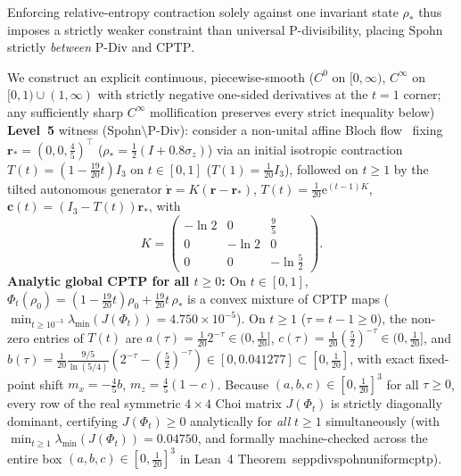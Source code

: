 \documentclass[twocolumn,10pt,amsmath,amssymb,floatfix]{revtex4-2}
\theoremstyle{plain}
\theoremstyle{definition}
\newcommand{\ee}{\mathrm{e}}
\newcommand{\leanid}[1]{{\footnotesize\ttfamily\def\_{\textunderscore\penalty0\hspace{0pt}}#1}}
\begin{document}
Enforcing relative-entropy contraction solely against one invariant state $\rho_*$ thus imposes a strictly weaker constraint than universal P-divisibility, placing $\mathrm{Spohn}$ strictly \emph{between} $\mathrm{P\text{-}Div}$ and $\mathrm{CPTP}$.

We construct an explicit continuous, piecewise-smooth ($C^0$ on $[0,\infty)$, $C^\infty$ on $[0,1)\cup(1,\infty)$ with strictly negative one-sided derivatives at the $t=1$ corner; any sufficiently sharp $C^\infty$ mollification preserves every strict inequality below) \textbf{Level~5} witness ($\mathrm{Spohn} \setminus \mathrm{P\text{-}Div}$): consider a non-unital affine Bloch flow~\cite{Ruskai2002LAA} fixing $\mathbf{r}_* = (0, 0, \frac{4}{5})^\top$ ($\rho_* = \frac{1}{2}(I + 0.8\sigma_z)$) via an initial isotropic contraction $T(t) = (1 - \frac{19}{20}t)I_3$ on $t \in [0,1]$ ($T(1) = \frac{1}{20}I_3$), followed on $t \ge 1$ by the tilted autonomous generator $\dot{\mathbf{r}} = K(\mathbf{r} - \mathbf{r}_*)$, $T(t) = \frac{1}{20}\ee^{(t-1)K}$, $\mathbf{c}(t) = (I_3 - T(t))\mathbf{r}_*$, with
\begin{equation}
\label{eq:level5_K}
K = \begin{pmatrix} -\ln 2 & 0 & \tfrac{9}{5} \\ 0 & -\ln 2 & 0 \\ 0 & 0 & -\ln\tfrac{5}{2} \end{pmatrix}.
\end{equation}
\textbf{Analytic global CPTP for all $t \ge 0$:} On $t \in [0,1]$, $\Phi_t(\rho_0) = (1-\frac{19}{20}t)\rho_0 + \frac{19}{20}t\,\rho_*$ is a convex mixture of CPTP maps ($\min_{t \ge 10^{-3}} \lambda_{\min}(J(\Phi_t)) = 4.750\times 10^{-5}$). On $t \ge 1$ ($\tau = t - 1 \ge 0$), the non-zero entries of $T(t)$ are $a(\tau) = \frac{1}{20}2^{-\tau} \in (0, \frac{1}{20}]$, $c(\tau) = \frac{1}{20}(\frac{5}{2})^{-\tau} \in (0, \frac{1}{20}]$, and $b(\tau) = \frac{1}{20}\frac{9/5}{\ln(5/4)}(2^{-\tau} - (\frac{5}{2})^{-\tau}) \in [0, 0.041277] \subset [0, \frac{1}{20}]$, with exact fixed-point shift $m_x = -\frac{4}{5}b$, $m_z = \frac{4}{5}(1-c)$. Because $(a, b, c) \in [0, \frac{1}{20}]^3$ for all $\tau \ge 0$, every row of the real symmetric $4\times 4$ Choi matrix $J(\Phi_t)$ is strictly diagonally dominant, certifying $J(\Phi_t) \ge 0$ analytically for \emph{all} $t \ge 1$ simultaneously (with $\min_{t\ge 1}\lambda_{\min}(J(\Phi_t)) = 0.04750$, and formally machine-checked across the entire box $(a,b,c) \in [0,\frac{1}{20}]^3$ in Lean~4 Theorem~\leanid{sep\_pdiv\_spohn\_uniform\_cptp}).
\end{document}
